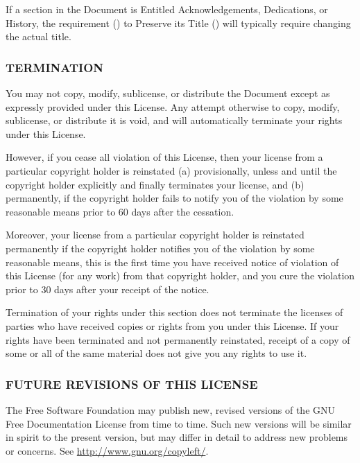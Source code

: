 \documentclass[10pt,english]{article}
\begin{document}
If a section in the Document is Entitled \textquotedbl{}Acknowledgements\textquotedbl{},
\textquotedbl{}Dedications\textquotedbl{}, or \textquotedbl{}History\textquotedbl{},
the requirement () to Preserve its Title
() will typically require
changing the actual title.


\subsubsection{TERMINATION}

You may not copy, modify, sublicense, or distribute the Document except
as expressly provided under this License. Any attempt otherwise to
copy, modify, sublicense, or distribute it is void, and will automatically
terminate your rights under this License.

However, if you cease all violation of this License, then your license
from a particular copyright holder is reinstated (a) provisionally,
unless and until the copyright holder explicitly and finally terminates
your license, and (b) permanently, if the copyright holder fails to
notify you of the violation by some reasonable means prior to 60 days
after the cessation.

Moreover, your license from a particular copyright holder is reinstated
permanently if the copyright holder notifies you of the violation
by some reasonable means, this is the first time you have received
notice of violation of this License (for any work) from that copyright
holder, and you cure the violation prior to 30 days after your receipt
of the notice.

Termination of your rights under this section does not terminate the
licenses of parties who have received copies or rights from you under
this License. If your rights have been terminated and not permanently
reinstated, receipt of a copy of some or all of the same material
does not give you any rights to use it.


\subsubsection{FUTURE REVISIONS OF THIS LICENSE}

The Free Software Foundation may publish new, revised versions of
the GNU Free Documentation License from time to time. Such new versions
will be similar in spirit to the present version, but may differ in
detail to address new problems or concerns. See \url{http://www.gnu.org/copyleft/}.
\end{document}
